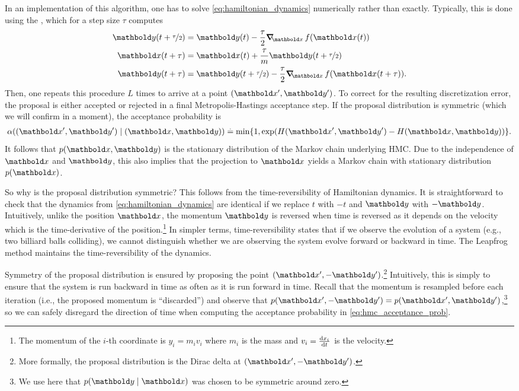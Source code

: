 In an implementation of this algorithm, one has to solve \cref{eq:hamiltonian_dynamics} numerically rather than exactly.
Typically, this is done using the , which for a step size $\tau$ computes \begin{subequations}\begin{align}
  \vy(t + \nicefrac{\tau}{2}) &= \vy(t) - \frac{\tau}{2} \grad_\vx f(\vx(t)) \label{eq:leapfrog_y1} \\
  \vx(t + \tau) &= \vx(t) + \frac{\tau}{m} \vy(t + \nicefrac{\tau}{2}) \label{eq:leapfrog_x} \\
  \vy(t + \tau) &= \vy(t + \nicefrac{\tau}{2}) - \frac{\tau}{2} \grad_\vx f(\vx(t + \tau)).
\end{align}\label{eq:leapfrog}\end{subequations}
Then, one repeats this procedure $L$ times to arrive at a point $(\vxp, \vyp)$.
To correct for the resulting discretization error, the proposal is either accepted or rejected in a final Metropolis-Hastings acceptance step.
If the proposal distribution is symmetric (which we will confirm in a moment), the acceptance probability is \begin{align}
  \alpha((\vxp, \vyp) \mid (\vx, \vy)) \defeq \min\{1, \exp(H(\vxp, \vyp) - H(\vx, \vy))\}. \label{eq:hmc_acceptance_prob}
\end{align}
It follows that $p(\vx, \vy)$ is the stationary distribution of the Markov chain underlying HMC.
Due to the independence of $\vx$ and $\vy$, this also implies that the projection to $\vx$ yields a Markov chain with stationary distribution $p(\vx)$.

So why is the proposal distribution symmetric?
This follows from the time-reversibility of Hamiltonian dynamics.
It is straightforward to check that the dynamics from \cref{eq:hamiltonian_dynamics} are identical if we replace $t$ with $-t$ and $\vy$ with $-\vy$.
Intuitively, unlike the position $\vx$, the momentum $\vy$ is reversed when time is reversed as it depends on the velocity which is the time-derivative of the position.\footnote{The momentum of the $i$-th coordinate is $y_i = m_i v_i$ where $m_i$ is the mass and $v_i = \odv{x_i}{t}$ is the velocity.}
In simpler terms, time-reversibility states that if we observe the evolution of a system (e.g., two billiard balls colliding), we cannot distinguish whether we are observing the system evolve forward or backward in time.
The Leapfrog method maintains the time-reversibility of the dynamics.

Symmetry of the proposal distribution is ensured by proposing the point $(\vxp, -\vyp)$.\footnote{More formally, the proposal distribution is the Dirac delta at $(\vxp, -\vyp)$.}
Intuitively, this is simply to ensure that the system is run backward in time as often as it is run forward in time.
Recall that the momentum is resampled before each iteration (i.e., the proposed momentum is ``discarded'') and observe that $p(\vxp, -\vyp) = p(\vxp, \vyp)$,\footnote{We use here that $p(\vy \mid \vx)$ was chosen to be symmetric around zero.} so we can safely disregard the direction of time when computing the acceptance probability in \cref{eq:hmc_acceptance_prob}.

